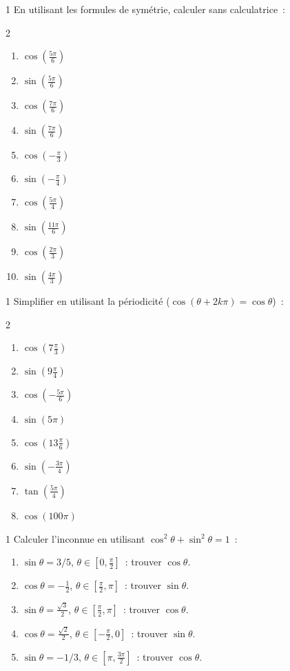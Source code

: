 \begin{exo}{1}
En utilisant les formules de sym\'etrie, calculer sans calculatrice~:
\begin{multicols}{2}
\begin{enumerate}
  \item $\cos(\frac{5\pi}{6})$
  \item $\sin(\frac{5\pi}{6})$
  \item $\cos(\frac{7\pi}{6})$
  \item $\sin(\frac{7\pi}{6})$
  \item $\cos(-\frac{\pi}{3})$
  \item $\sin(-\frac{\pi}{4})$
  \item $\cos(\frac{5\pi}{4})$
  \item $\sin(\frac{11\pi}{6})$
  \item $\cos(\frac{2\pi}{3})$
  \item $\sin(\frac{4\pi}{3})$
\end{enumerate}
\end{multicols}
\end{exo}

\begin{exo}{1}
Simplifier en utilisant la p\'eriodicit\'e ($\cos(\theta+2k\pi)=\cos\theta$)~:
\begin{multicols}{2}
\begin{enumerate}
  \item $\cos(7\frac{\pi}{3})$
  \item $\sin(9\frac{\pi}{4})$
  \item $\cos(-\frac{5\pi}{6})$
  \item $\sin(5\pi)$
  \item $\cos(13\frac{\pi}{6})$
  \item $\sin(-\frac{3\pi}{4})$
  \item $\tan(\frac{5\pi}{4})$
  \item $\cos(100\pi)$
\end{enumerate}
\end{multicols}
\end{exo}

\begin{exo}{1}
Calculer l'inconnue en utilisant $\cos^2\theta+\sin^2\theta=1$~:
\begin{enumerate}
  \item $\sin\theta=3/5$, $\theta\in[0,\frac{\pi}{2}]$~: trouver $\cos\theta$.
  \item $\cos\theta=-\frac{1}{2}$, $\theta\in[\frac{\pi}{2},\pi]$~: trouver $\sin\theta$.
  \item $\sin\theta=\frac{\sqrt{3}}{2}$, $\theta\in[\frac{\pi}{2},\pi]$~: trouver $\cos\theta$.
  \item $\cos\theta=\frac{\sqrt{2}}{2}$, $\theta\in[-\frac{\pi}{2},0]$~: trouver $\sin\theta$.
  \item $\sin\theta=-1/3$, $\theta\in[\pi,\frac{3\pi}{2}]$~: trouver $\cos\theta$.
\end{enumerate}
\end{exo}

